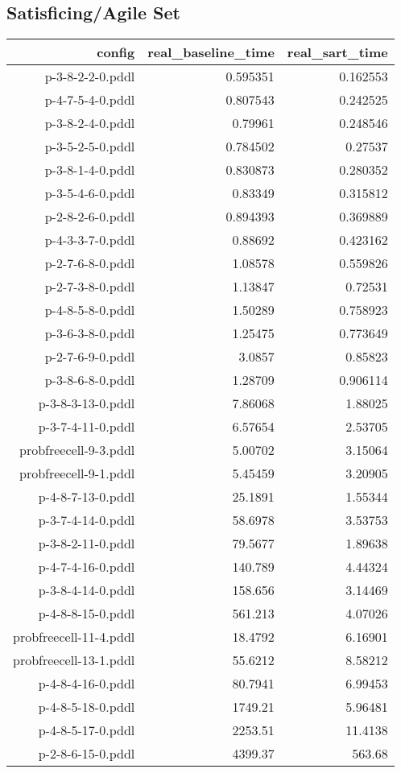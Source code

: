 \documentclass{article}
\begin{document}
                    
                    \subsection*{Satisficing/Agile Set}
                    
                            \begin{center}
                            \scriptsize
                            \begin{tabular}{r|r|r}
                            config & real\_baseline\_time & real\_sart\_time\\\midrule
                             p-3-8-2-2-0.pddl&0.595351&0.162553\\
 p-4-7-5-4-0.pddl&0.807543&0.242525\\
 p-3-8-2-4-0.pddl&0.79961&0.248546\\
 p-3-5-2-5-0.pddl&0.784502&0.27537\\
 p-3-8-1-4-0.pddl&0.830873&0.280352\\
 p-3-5-4-6-0.pddl&0.83349&0.315812\\
 p-2-8-2-6-0.pddl&0.894393&0.369889\\
 p-4-3-3-7-0.pddl&0.88692&0.423162\\
 p-2-7-6-8-0.pddl&1.08578&0.559826\\
 p-2-7-3-8-0.pddl&1.13847&0.72531\\
 p-4-8-5-8-0.pddl&1.50289&0.758923\\
 p-3-6-3-8-0.pddl&1.25475&0.773649\\
 p-2-7-6-9-0.pddl&3.0857&0.85823\\
 p-3-8-6-8-0.pddl&1.28709&0.906114\\
 p-3-8-3-13-0.pddl&7.86068&1.88025\\
 p-3-7-4-11-0.pddl&6.57654&2.53705\\
 probfreecell-9-3.pddl&5.00702&3.15064\\
 probfreecell-9-1.pddl&5.45459&3.20905\\
 p-4-8-7-13-0.pddl&25.1891&1.55344\\
 p-3-7-4-14-0.pddl&58.6978&3.53753\\
 p-3-8-2-11-0.pddl&79.5677&1.89638\\
 p-4-7-4-16-0.pddl&140.789&4.44324\\
 p-3-8-4-14-0.pddl&158.656&3.14469\\
 p-4-8-8-15-0.pddl&561.213&4.07026\\
 probfreecell-11-4.pddl&18.4792&6.16901\\
 probfreecell-13-1.pddl&55.6212&8.58212\\
 p-4-8-4-16-0.pddl&80.7941&6.99453\\
 p-4-8-5-18-0.pddl&1749.21&5.96481\\
 p-4-8-5-17-0.pddl&2253.51&11.4138\\
 p-2-8-6-15-0.pddl&4399.37&563.68
                            \end{tabular}
                            \end{center}
                    
\end{document}
